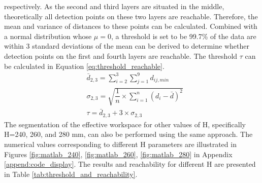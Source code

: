 respectively. As the second and third layers are situated in the middle, theoretically all detection points on 
these two layers are reachable. Therefore, the mean and variance of distances to these points can be calculated. 
Combined with a normal distribution whose $\mu = 0$, a threshold is set to be 99.7\% of the data are within 3 
standard deviations of the mean can be derived to determine whether detection points on the first and fourth 
layers are reachable. The threshold $\tau$ can be calculated in Equation \ref{eq:threshold_reachable}. \\
\begin{align}
    &\bar{d}_{2,3} = \sum_{i=2}^3 \sum_{j=1}^9 d_{ij,min} \nonumber \\
    &\sigma_{2,3}=\sqrt{\dfrac{1}{n}\times\sum_{i=1}^n(d_i-\bar{d})^2} \nonumber \\
    &\tau = \bar{d}_{2,3} + 3\times\sigma_{2,3}
    \label{eq:threshold_reachable}
\end{align}
The segmentation of the effective workspace for other values of H, specifically H=240, 260, and 280 mm, 
can also be performed using the same approach. The numerical values corresponding to different H parameters 
are illustrated in Figures \ref{fig:matlab_240}, \ref{fig:matlab_260}, \ref{fig:matlab_280} in Appendix 
\ref{append:code_display}. The results and reachability for different H are presented in Table 
\ref{tab:threshold_and_reachability}.
